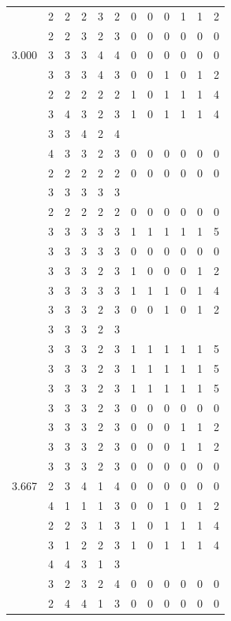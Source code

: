 \documentclass[]{book}
\theoremstyle{definition}
\theoremstyle{definition}
\theoremstyle{definition}
\theoremstyle{remark}
\begin{document}
\begin{table}
{\begin{tabular}[t]{rrrrrrrrrrrr}
 & 2 & 2 & 2 & 3 & 2 & 0 & 0 & 0 & 1 & 1 & 2\\
 & 2 & 2 & 3 & 2 & 3 & 0 & 0 & 0 & 0 & 0 & 0\\
3.000 & 3 & 3 & 3 & 4 & 4 & 0 & 0 & 0 & 0 & 0 & 0\\
 & 3 & 3 & 3 & 4 & 3 & 0 & 0 & 1 & 0 & 1 & 2\\
 & 2 & 2 & 2 & 2 & 2 & 1 & 0 & 1 & 1 & 1 & 4\\
 & 3 & 4 & 3 & 2 & 3 & 1 & 0 & 1 & 1 & 1 & 4\\
 & 3 & 3 & 4 & 2 & 4 &  &  &  &  &  & \\
 & 4 & 3 & 3 & 2 & 3 & 0 & 0 & 0 & 0 & 0 & 0\\
 & 2 & 2 & 2 & 2 & 2 & 0 & 0 & 0 & 0 & 0 & 0\\
 & 3 & 3 & 3 & 3 & 3 &  &  &  &  &  & \\
 & 2 & 2 & 2 & 2 & 2 & 0 & 0 & 0 & 0 & 0 & 0\\
 & 3 & 3 & 3 & 3 & 3 & 1 & 1 & 1 & 1 & 1 & 5\\
 & 3 & 3 & 3 & 3 & 3 & 0 & 0 & 0 & 0 & 0 & 0\\
 & 3 & 3 & 3 & 2 & 3 & 1 & 0 & 0 & 0 & 1 & 2\\
 & 3 & 3 & 3 & 3 & 3 & 1 & 1 & 1 & 0 & 1 & 4\\
 & 3 & 3 & 3 & 2 & 3 & 0 & 0 & 1 & 0 & 1 & 2\\
 & 3 & 3 & 3 & 2 & 3 &  &  &  &  &  & \\
 & 3 & 3 & 3 & 2 & 3 & 1 & 1 & 1 & 1 & 1 & 5\\
 & 3 & 3 & 3 & 2 & 3 & 1 & 1 & 1 & 1 & 1 & 5\\
 & 3 & 3 & 3 & 2 & 3 & 1 & 1 & 1 & 1 & 1 & 5\\
 & 3 & 3 & 3 & 2 & 3 & 0 & 0 & 0 & 0 & 0 & 0\\
 & 3 & 3 & 3 & 2 & 3 & 0 & 0 & 0 & 1 & 1 & 2\\
 & 3 & 3 & 3 & 2 & 3 & 0 & 0 & 0 & 1 & 1 & 2\\
 & 3 & 3 & 3 & 2 & 3 & 0 & 0 & 0 & 0 & 0 & 0\\
3.667 & 2 & 3 & 4 & 1 & 4 & 0 & 0 & 0 & 0 & 0 & 0\\
 & 4 & 1 & 1 & 1 & 3 & 0 & 0 & 1 & 0 & 1 & 2\\
 & 2 & 2 & 3 & 1 & 3 & 1 & 0 & 1 & 1 & 1 & 4\\
 & 3 & 1 & 2 & 2 & 3 & 1 & 0 & 1 & 1 & 1 & 4\\
 & 4 & 4 & 3 & 1 & 3 &  &  &  &  &  & \\
 & 3 & 2 & 3 & 2 & 4 & 0 & 0 & 0 & 0 & 0 & 0\\
 & 2 & 4 & 4 & 1 & 3 & 0 & 0 & 0 & 0 & 0 & 0\\

\end{tabular}}
\end{table}
\end{document}
